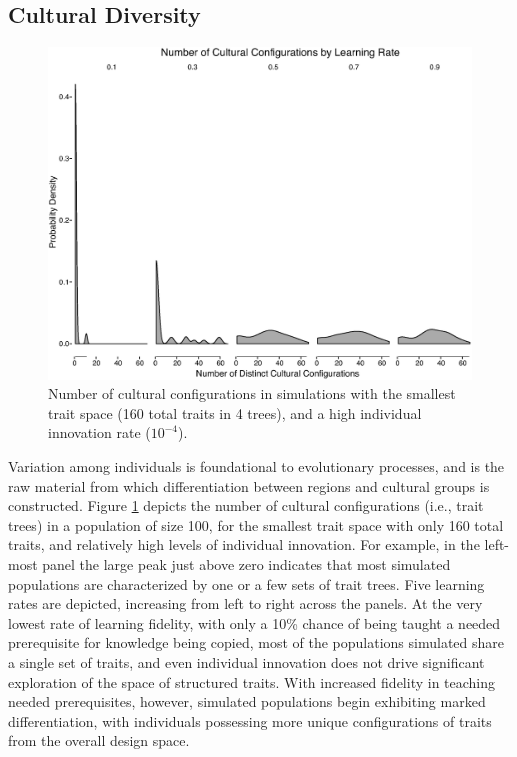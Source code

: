 \subsection{Cultural Diversity}\label{cultural-diversity}

\begin{figure}[htbp]
    \centering
    \includegraphics[scale=0.4]{graphics/semanticaxelrod/small-trait-high-innovation-num-configs.eps}
    \caption{Number of cultural configurations in simulations with the smallest trait space (160 total traits in 4 trees), and a high individual innovation rate ($10^{-4}$).}
    \label{img:culture-count-sm-trait-high-innov}
\end{figure}

Variation among individuals is foundational to evolutionary processes,
and is the raw material from which differentiation between regions and
cultural groups is constructed. Figure
\ref{img:culture-count-sm-trait-high-innov} depicts the number of
cultural configurations (i.e., trait trees) in a population of size 100,
for the smallest trait space with only 160 total traits, and relatively
high levels of individual innovation. For example, in the left-most
panel the large peak just above zero indicates that most simulated
populations are characterized by one or a few sets of trait trees. Five
learning rates are depicted, increasing from left to right across the
panels. At the very lowest rate of learning fidelity, with only a 10\%
chance of being taught a needed prerequisite for knowledge being copied,
most of the populations simulated share a single set of traits, and even
individual innovation does not drive significant exploration of the
space of structured traits. With increased fidelity in teaching needed
prerequisites, however, simulated populations begin exhibiting marked
differentiation, with individuals possessing more unique configurations
of traits from the overall design space.

